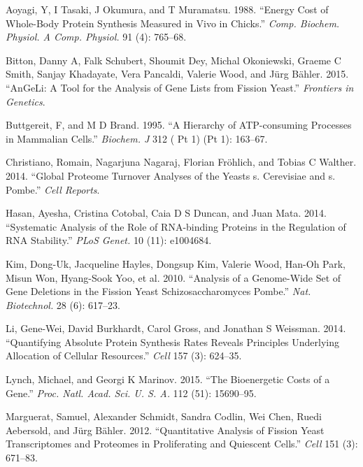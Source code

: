 \documentclass[
]{article}
\newlength{\cslhangindent}
\newlength{\cslentryspacingunit} %
\newenvironment{CSLReferences}[2] %
 {%
  \setlength{\parindent}{0pt}
  \ifodd #1
  \let\oldpar\par
  \def\par{\hangindent=\cslhangindent\oldpar}
  \fi
  \setlength{\parskip}{#2\cslentryspacingunit}
 }%
 {}
\begin{document}
\hypertarget{refs}{}
\begin{CSLReferences}{1}{0}
\leavevmode{}%
Aoyagi, Y, I Tasaki, J Okumura, and T Muramatsu. 1988. {``Energy Cost of Whole-Body Protein Synthesis Measured in Vivo in Chicks.''} \emph{Comp. Biochem. Physiol. A Comp. Physiol.} 91 (4): 765--68.

\leavevmode{}%
Bitton, Danny A, Falk Schubert, Shoumit Dey, Michal Okoniewski, Graeme C Smith, Sanjay Khadayate, Vera Pancaldi, Valerie Wood, and Jürg Bähler. 2015. {``{AnGeLi}: A Tool for the Analysis of Gene Lists from Fission Yeast.''} \emph{Frontiers in Genetics}.

\leavevmode{}%
Buttgereit, F, and M D Brand. 1995. {``A Hierarchy of {ATP-consuming} Processes in Mammalian Cells.''} \emph{Biochem. J} 312 ( Pt 1) (Pt 1): 163--67.

\leavevmode{}%
Christiano, Romain, Nagarjuna Nagaraj, Florian Fröhlich, and Tobias C Walther. 2014. {``Global Proteome Turnover Analyses of the Yeasts s. Cerevisiae and s. Pombe.''} \emph{Cell Reports}.

\leavevmode{}%
Hasan, Ayesha, Cristina Cotobal, Caia D S Duncan, and Juan Mata. 2014. {``Systematic Analysis of the Role of {RNA-binding} Proteins in the Regulation of {RNA} Stability.''} \emph{PLoS Genet.} 10 (11): e1004684.

\leavevmode{}%
Kim, Dong-Uk, Jacqueline Hayles, Dongsup Kim, Valerie Wood, Han-Oh Park, Misun Won, Hyang-Sook Yoo, et al. 2010. {``Analysis of a Genome-Wide Set of Gene Deletions in the Fission Yeast Schizosaccharomyces Pombe.''} \emph{Nat. Biotechnol.} 28 (6): 617--23.

\leavevmode{}%
Li, Gene-Wei, David Burkhardt, Carol Gross, and Jonathan S Weissman. 2014. {``Quantifying Absolute Protein Synthesis Rates Reveals Principles Underlying Allocation of Cellular Resources.''} \emph{Cell} 157 (3): 624--35.

\leavevmode{}%
Lynch, Michael, and Georgi K Marinov. 2015. {``The Bioenergetic Costs of a Gene.''} \emph{Proc. Natl. Acad. Sci. U. S. A.} 112 (51): 15690--95.

\leavevmode{}%
Marguerat, Samuel, Alexander Schmidt, Sandra Codlin, Wei Chen, Ruedi Aebersold, and Jürg Bähler. 2012. {``Quantitative Analysis of Fission Yeast Transcriptomes and Proteomes in Proliferating and Quiescent Cells.''} \emph{Cell} 151 (3): 671--83.


\end{CSLReferences}
\end{document}
